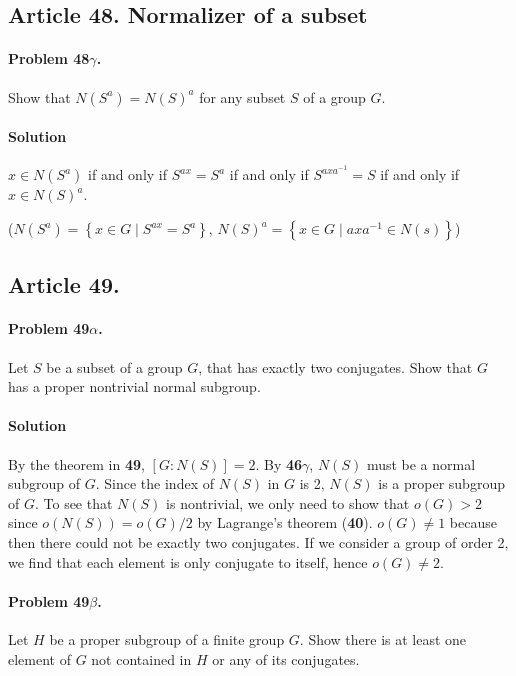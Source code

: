 \subsection{Article 48. Normalizer of a subset}

\paragraph{Problem 48$\gamma$.}
Show that $N(S^a) = N(S)^a$ for any subset $S$ of a group $G$.

\paragraph*{Solution}
$x \in N(S^a)$ if and only if $S^{ax} = S^a$ if and only if $S^{axa^{-1}} = S$
if and only if $x \in N(S)^a$.

($N(S^a) = \left\{ x \in G \mid S^{ax} = S^a \right\}$,
$N(S)^a = \left\{ x \in G \mid axa^{-1} \in N(s) \right\}$)

\subsection{Article 49.}

\paragraph{Problem 49$\alpha$.}
Let $S$ be a subset of a group $G$, that has exactly two conjugates. Show that
$G$ has a proper nontrivial normal subgroup.

\paragraph*{Solution}
By the theorem in \textbf{49}, $[G : N(S)] = 2$. By \textbf{46$\gamma$}, $N(S)$
must be a normal subgroup of $G$. Since the index of $N(S)$ in $G$ is 2, $N(S)$ is a
proper subgroup of $G$. To see that $N(S)$ is nontrivial, we only need to show
that $o(G) > 2$ since $o(N(S)) = o(G)/2$ by Lagrange's theorem (\textbf{40}).
$o(G) \neq 1$ because then there could not be exactly two conjugates. If we
consider a group of order 2, we find that each element is only conjugate to
itself, hence $o(G) \neq 2$.

\paragraph{Problem 49$\beta$.}
Let $H$ be a proper subgroup of a finite group $G$. Show there is at least
one element of $G$ not contained in $H$ or any of its conjugates.

